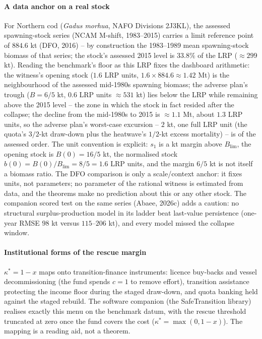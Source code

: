 \documentclass[preprint,11pt,authoryear]{elsarticle}
\theoremstyle{remark}
\begin{document}
\paragraph{A data anchor on a real stock} For Northern cod (\emph{Gadus morhua}, NAFO Divisions 2J3KL), the assessed spawning-stock series (NCAM M-shift, 1983--2015) carries a limit reference point of $884.6$ kt (DFO, 2016) -- by construction the 1983--1989 mean spawning-stock biomass of that series; the stock's assessed 2015 level is $33.8\%$ of the LRP ($\approx299$ kt). Reading the benchmark's floor as this LRP fixes the dashboard arithmetic: the witness's opening stock ($1.6$ LRP units, $1.6\times884.6\approx1.42$ Mt) is the neighbourhood of the assessed mid-1980s spawning biomass; the adverse plan's trough ($B=6/5$ kt, $0.6$ LRP units $\approx531$ kt) lies below the LRP while remaining above the 2015 level -- the zone in which the stock in fact resided after the collapse; the decline from the mid-1980s to 2015 is $\approx1.1$ Mt, about $1.3$ LRP units, so the adverse plan's worst-case excursion -- $2$ kt, one full LRP unit (the quota's $3/2$-kt draw-down plus the heatwave's $1/2$-kt excess mortality) -- is of the assessed order. The unit convention is explicit: $s_1$ is a kt margin above $B_{\mathrm{lim}}$, the opening stock is $B(0)=16/5$ kt, the normalised stock $b(0)=B(0)/B_{\mathrm{lim}}=8/5=1.6$ LRP units, and the margin $6/5$ kt is not itself a biomass ratio. The DFO comparison is only a scale/context anchor: it fixes units, not parameters; no parameter of the rational witness is estimated from data, and the theorems make no prediction about this or any other stock. The companion scored test on the same series (Abaee, 2026c) adds a caution: no structural surplus-production model in its ladder beat last-value persistence (one-year RMSE $98$ kt versus $115$--$206$ kt), and every model missed the collapse window.

\paragraph{Institutional forms of the rescue margin} $\kappa^*=1-x$ maps onto transition-finance instruments: licence buy-backs and vessel decommissioning (the fund spends $c=1$ to remove effort), transition assistance protecting the income floor during the staged draw-down, and quota banking held against the staged rebuild. The software companion (the SafeTransition library) realises exactly this menu on the benchmark datum, with the rescue threshold truncated at zero once the fund covers the cost ($\kappa^*=\max(0,1-x)$). The mapping is a reading aid, not a theorem.
\end{document}
